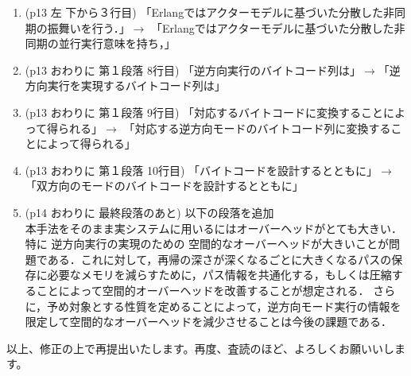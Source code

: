 \documentclass[a4j]{jarticle}
\begin{document}
\begin{enumerate}
\item (p13 左 下から３行目) 「Erlangではアクターモデルに基づいた分散した非同期の振舞いを行う．」$\rightarrow$
「Erlangではアクターモデルに基づいた分散した非同期の並行実行意味を持ち，」
\item (p13 おわりに 第１段落 8行目) 「逆方向実行のバイトコード列は」$\rightarrow$「逆方向実行を実現するバイトコード列は」
\item (p13 おわりに 第１段落 9行目) 「対応するバイトコードに変換することによって得られる」$\rightarrow$
「対応する逆方向モードのバイトコード列に変換することによって得られる」
\item (p13 おわりに 第１段落 10行目) 「バイトコードを設計するとともに」$\rightarrow$「双方向のモードのバイトコードを設計するとともに」
\item (p14 おわりに 最終段落のあと) 以下の段落を追加\\

本手法をそのまま実システムに用いるにはオーバーヘッドがとても大きい．
特に%
逆方向実行の実現のための%
空間的なオーバーヘッドが大きいことが問題である．これに対して，再帰の深さが深くなるごとに大きくなるパスの保存に必要なメモリを減らすために，パス情報を共通化する，もしくは圧縮することによって空間的オーバーヘッドを改善することが想定される．
さらに，予め対象とする性質を定めることによって，逆方向モード実行の情報を
限定して空間的なオーバーヘッドを減少させることは今後の課題である．

\end{enumerate}

以上、修正の上で再提出いたします。再度、査読のほど、よろしくお願いいします。
\end{document}
